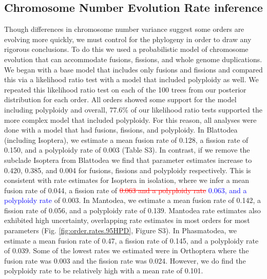 \documentclass[]{rsos}%
\begin{document}
\subsection{Chromosome Number Evolution Rate inference}
Though differences in chromosome number variance suggest some orders are evolving more quickly, we must control for the phylogeny in order to draw any rigorous conclusions.
To do this we used a probabilistic model of chromosome evolution that can accommodate fusions, fissions, and whole genome duplications.
We began with a base model that includes only fusions and fissions and compared this via a likelihood ratio test with a model that included polyploidy as well.
We repeated this likelihood ratio test on each of the 100 trees from our posterior distribution for each order.
All orders showed some support for the model including polyploidy and overall, 77.6\% of our likelihood ratio tests supported the more complex model that included polyploidy.
For this reason, all analyses were done with a model that had fusions, fissions, and polyploidy.
In Blattodea (including Isoptera), we estimate a mean fusion rate of 0.128, a fission rate of 0.150, and a polyploidy rate of 0.003 (Table S3).
In contrast, if we remove the subclade Isoptera from Blattodea we find that parameter estimates increase to 0.420, 0.385, and 0.004 for fusions, fissions and polyploidy respectively.
This is consistent with rate estimates for Isoptera in isolation, where we infer
a mean fusion rate of 0.044, a fission rate of \textcolor{red}{\st{0.063 and a polyploidy rate}} \textcolor{blue}{0.063, and a polyploidy rate} of 0.003.
In Mantodea, we estimate a mean fusion rate of 0.142, a fission rate of 0.056, and a polyploidy rate of 0.139.
Mantodea rate estimates also exhibited high uncertainty, overlapping rate estimates in most orders for most parameters (Fig. \ref{fig:order.rates.95HPD}, Figure S3).
In Phasmatodea, we estimate a mean fusion rate of 0.47, a fission rate of 0.145, and a polyploidy rate of 0.039.
Some of the lowest rates we estimated were in Orthoptera where the fusion rate was 0.003 and the fission rate was 0.024. However, we do find the polyploidy rate to be relatively high with a mean rate of 0.101.
\end{document}

